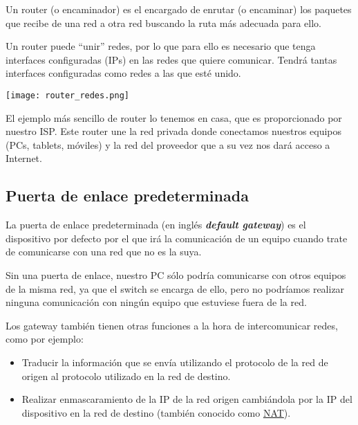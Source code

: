 Un router (o encaminador) es el encargado de enrutar (o encaminar) los paquetes que recibe de una red a otra red buscando la ruta más adecuada para ello.

Un router puede “unir” redes, por lo que para ello es necesario que tenga interfaces configuradas (IPs) en las redes que quiere comunicar. Tendrá tantas interfaces configuradas como redes a las que esté unido.


\begin{center}
    \vspace{-15pt}
    \texttt{[image: router\_redes.png]}
    \vspace{-5pt}
    \vspace{-15pt}
\end{center}

El ejemplo más sencillo de router lo tenemos en casa, que es proporcionado por nuestro ISP. Este router une la red privada donde conectamos nuestros equipos (PCs, tablets, móviles) y la red del proveedor que a su vez nos dará acceso a Internet.


\hypertarget{default_gateway}{}
\subsection{Puerta de enlace predeterminada}
La puerta de enlace predeterminada (en inglés \textit{\textbf{default gateway}}) es el dispositivo por defecto por el que irá la comunicación de un equipo cuando trate de comunicarse con una red que no es la suya.

Sin una puerta de enlace, nuestro PC sólo podría comunicarse con otros equipos de la misma red, ya que el switch se encarga de ello, pero no podríamos realizar ninguna comunicación con ningún equipo que estuviese fuera de la red.


Los gateway también tienen otras funciones a la hora de intercomunicar redes, como por ejemplo:
\begin{itemize}
    \item Traducir la información que se envía utilizando el protocolo de la red de origen al protocolo utilizado en la red de destino.
    \item Realizar enmascaramiento de la IP de la red origen cambiándola por la IP del dispositivo en la red de destino (también conocido como \hyperlink{nat}{NAT}).
\end{itemize}


